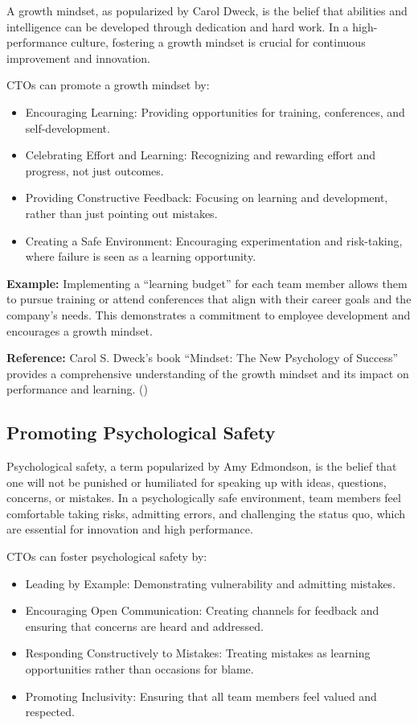 A growth mindset, as popularized by Carol Dweck, is the belief that abilities and intelligence can be developed through dedication and hard work. In a high-performance culture, fostering a growth mindset is crucial for continuous improvement and innovation.

CTOs can promote a growth mindset by:
\begin{itemize}
    \item Encouraging Learning: Providing opportunities for training, conferences, and self-development.
    \item Celebrating Effort and Learning: Recognizing and rewarding effort and progress, not just outcomes.
    \item Providing Constructive Feedback: Focusing on learning and development, rather than just pointing out mistakes.
    \item Creating a Safe Environment: Encouraging experimentation and risk-taking, where failure is seen as a learning opportunity.
\end{itemize}

\textbf{Example:} Implementing a ``learning budget'' for each team member allows them to pursue training or attend conferences that align with their career goals and the company's needs. This demonstrates a commitment to employee development and encourages a growth mindset.

\textbf{Reference:} Carol S. Dweck's book ``Mindset: The New Psychology of Success'' provides a comprehensive understanding of the growth mindset and its impact on performance and learning. (\cite{dweck2015})

\subsection{Promoting Psychological Safety}

Psychological safety, a term popularized by Amy Edmondson, is the belief that one will not be punished or humiliated for speaking up with ideas, questions, concerns, or mistakes. In a psychologically safe environment, team members feel comfortable taking risks, admitting errors, and challenging the status quo, which are essential for innovation and high performance.

CTOs can foster psychological safety by:
\begin{itemize}
    \item Leading by Example: Demonstrating vulnerability and admitting mistakes.
    \item Encouraging Open Communication: Creating channels for feedback and ensuring that concerns are heard and addressed.
    \item Responding Constructively to Mistakes: Treating mistakes as learning opportunities rather than occasions for blame.
    \item Promoting Inclusivity: Ensuring that all team members feel valued and respected.
\end{itemize}

